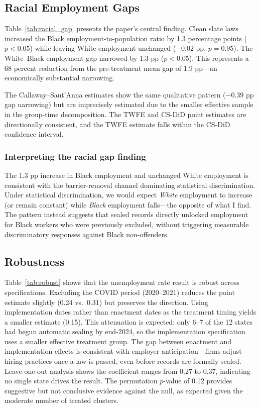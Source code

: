 \documentclass[12pt]{article}
\begin{document}
\subsection{Racial Employment Gaps}



Table~\ref{tab:racial_gap} presents the paper's central finding. Clean slate laws increased the Black employment-to-population ratio by 1.3 percentage points ($p < 0.05$) while leaving White employment unchanged ($-0.02$ pp, $p = 0.95$). The White--Black employment gap narrowed by 1.3 pp ($p < 0.05$). This represents a 68 percent reduction from the pre-treatment mean gap of 1.9 pp---an economically substantial narrowing.

The Callaway--Sant'Anna estimates show the same qualitative pattern ($-0.39$ pp gap narrowing) but are imprecisely estimated due to the smaller effective sample in the group-time decomposition. The TWFE and CS-DiD point estimates are directionally consistent, and the TWFE estimate falls within the CS-DiD confidence interval.

\subsubsection*{Interpreting the racial gap finding} The 1.3 pp increase in Black employment and unchanged White employment is consistent with the barrier-removal channel dominating statistical discrimination. Under statistical discrimination, we would expect \emph{White} employment to increase (or remain constant) while \emph{Black} employment falls---the opposite of what I find. The pattern instead suggests that sealed records directly unlocked employment for Black workers who were previously excluded, without triggering measurable discriminatory responses against Black non-offenders.

\subsection{Robustness}



Table~\ref{tab:robust} shows that the unemployment rate result is robust across specifications. Excluding the COVID period (2020--2021) reduces the point estimate slightly (0.24 vs.\ 0.31) but preserves the direction. Using implementation dates rather than enactment dates as the treatment timing yields a smaller estimate (0.15). This attenuation is expected: only 6--7 of the 12 states had begun automatic sealing by end-2024, so the implementation specification uses a smaller effective treatment group. The gap between enactment and implementation effects is consistent with employer anticipation---firms adjust hiring practices once a law is passed, even before records are formally sealed. Leave-one-out analysis shows the coefficient ranges from 0.27 to 0.37, indicating no single state drives the result. The permutation $p$-value of 0.12 provides suggestive but not conclusive evidence against the null, as expected given the moderate number of treated clusters.
\end{document}
